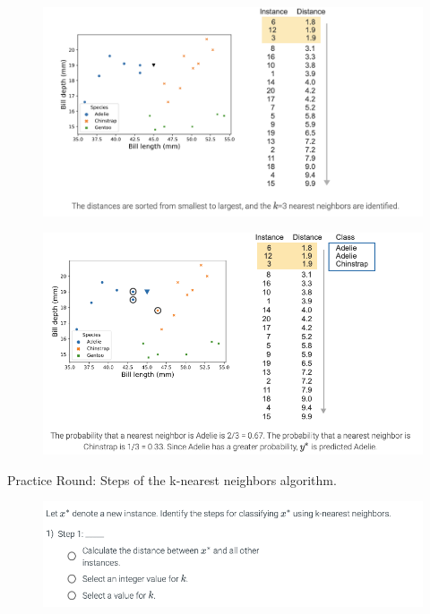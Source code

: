 \documentclass[8pt,dvipsnames]{beamer}
\begin{document}
\begin{frame}
	\begin{figure}[ht]
		\centering
		\includegraphics[width=\linewidth]{imgs/knn_12.png}
	\end{figure}
\end{frame}

\begin{frame}
	\begin{figure}[ht]
		\centering
		\includegraphics[width=\linewidth]{imgs/knn_13.png}
	\end{figure}
\end{frame}

\begin{frame}{Practice Round: Steps of the k-nearest neighbors algorithm.}
	\begin{figure}[ht]
		\centering
		\includegraphics[width=\linewidth]{imgs/knn_14.png}
	\end{figure}
\end{frame}
\end{document}

